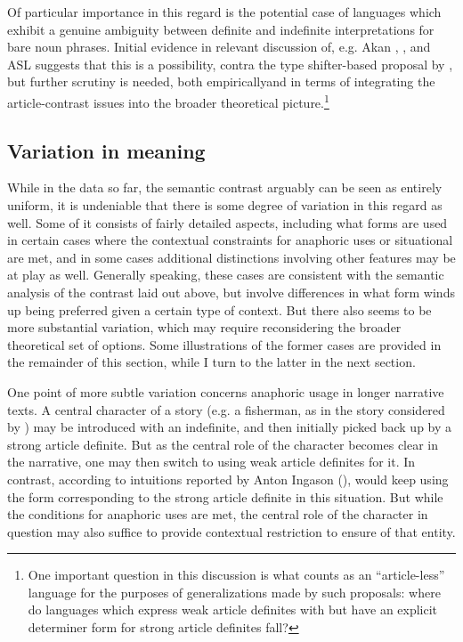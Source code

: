 \documentclass[output=paper
,modfonts
,nonflat]{langscibook}
\begin{document}
Of particular importance in this regard is the potential case of languages which
exhibit a genuine ambiguity between definite and indefinite
interpretations for bare noun phrases. Initial evidence in relevant
discussion of, e.g. Akan \citep{ArkohMatthewson2013}, 
\citep{SereikaiteToAppear}, and ASL \citep{Koulidobrova2012,Irani2017}
suggests that this is a possibility, contra the type shifter-based
proposal by \citet{Dayal2016}, but further scrutiny is needed, both
empirically\linebreak\newpage\noindent and in terms of integrating the article-contrast
issues into the broader theoretical picture.\footnote{One important question in this discussion
  is what counts as an ``article-less'' language for the purposes of
  generalizations made by such proposals: where do languages which
  express weak article definites with  but have an
  explicit determiner form for strong article definites fall?}






\subsection{Variation in meaning}


While in the data so far, the semantic contrast arguably can be seen
as entirely
uniform, it is undeniable that there is some degree of variation in
this regard as well. Some of it consists of fairly detailed aspects,
including what forms are used in certain cases where the contextual
constraints for anaphoric uses or
situational  are met, and in some cases additional
distinctions involving other features may be
at play as well. Generally speaking, these cases are consistent with
the semantic analysis of the contrast laid out above, but involve
differences in what form winds up being preferred given a certain type
of context. But there also seems to be more substantial
variation, which may require reconsidering the broader theoretical set
of options. Some illustrations of the former cases are provided in
the remainder of this section, while I turn to the latter in the next section.

One point of more subtle variation concerns anaphoric usage in longer
narrative texts. A central character of a story (e.g. a fisherman, as
in the  story considered by  \citealt{Ebert1971b}) may be
introduced with an indefinite, and then initially picked back up by a
strong article definite. But as the central role of the character becomes
clear in the narrative, one may then switch to using weak article
definites for it. In contrast, according to intuitions reported by Anton Ingason (\pc),  would keep using the form corresponding
to the strong article definite in this situation. But while the
conditions for anaphoric uses are met, the central role of the
character in question may also suffice to provide contextual
restriction to ensure  of that entity.
\end{document}
